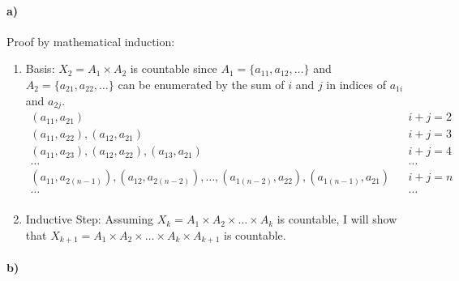 \documentclass[12pt]{article}
\newcommand\+{\mkern2mu}
\begin{document}
\paragraph{a)}
Proof by mathematical induction:
\begin{enumerate}
\item Basis: $X_2 = A_1 \times A_2$ is countable since $A_1 = \{a_{11}, a_{12}, \dotsc \}$ and $A_2 = \{a_{21}, a_{22}, \dotsc \}$ can be enumerated by the sum of $i$ and $j$ in indices of $a_{1i}$ and $a_{2j}$.
\begin{align*}
(a_{11}, a_{21}) && i + j = 2 \\
(a_{11}, a_{22}), (a_{12}, a_{21}) && i + j = 3 \\
(a_{11}, a_{23}), (a_{12}, a_{22}), (a_{13}, a_{21}) && i + j = 4 \\
\dotsc && \dotsc \\
(a_{11}, a_{2(n-1)}), (a_{12}, a_{2(n-2)}), \dotsc, (a_{1(n-2)}, a_{22}), (a_{1(n-1)}, a_{21}) && i + j = n\\
\dotsc && \dotsc \\
\end{align*}
\item Inductive Step: Assuming $X_k = A_1 \times A_2 \times \dotsc \times A_k$ is countable, I will show that $X_{k+1} = A_1 \times A_2 \times \dotsc \times A_k \times A_{k+1}$ is countable.
\end{enumerate}
\paragraph{b)}
\end{document}
